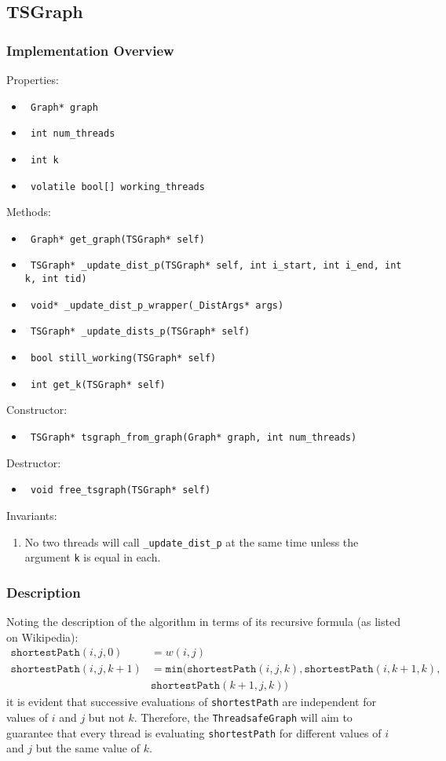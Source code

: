 \documentclass{article}
\newcommand{\field}[1]{\item \texttt{ #1 }}
\begin{document}
\subsection{TSGraph}
\subsubsection{Implementation Overview}
Properties:
\begin{itemize}
  \field{Graph* graph}
  \field{int num\_threads}
  \field{int k}
  \field{volatile bool[] working\_threads}\\
\end{itemize}
Methods:
\begin{itemize}
  \field{Graph* get\_graph(TSGraph* self)}
  \field{TSGraph* \_update\_dist\_p(TSGraph* self, int i\_start, int i\_end, int
    k, int tid)}
  \field{void* \_update\_dist\_p\_wrapper(\_DistArgs* args)}
  \field{TSGraph* \_update\_dists\_p(TSGraph* self)}
  \field{bool still\_working(TSGraph* self)}
  \field{int get\_k(TSGraph* self)}\\
\end{itemize}
Constructor:
\begin{itemize}
  \field{TSGraph* tsgraph\_from\_graph(Graph* graph, int num\_threads)}\\
\end{itemize}
Destructor:
\begin{itemize}
  \field{void free\_tsgraph(TSGraph* self)}\\
\end{itemize}
Invariants:
\begin{enumerate}
\item No two threads will call \texttt{\_update\_dist\_p} at the same
  time unless the argument \texttt{k} is equal in each.
\end{enumerate}

\subsubsection{Description}
Noting the description of the algorithm in terms of its recursive
formula (as listed on Wikipedia):
\begin{align*}
  \texttt{shortestPath}(i, j, 0) & =  w(i, j)\\
  \texttt{shortestPath}(i, j, k+1) & = 
  \texttt{min}(\texttt{shortestPath}(i, j, k), 
  \texttt{shortestPath}(i, k+1, k), \\ 
&\texttt{shortestPath}(k+1, j, k))
\end{align*}
\noindent
it is evident that successive evaluations of \texttt{shortestPath} are
independent for values of $i$ and $j$ but not $k$. Therefore, the
\texttt{ThreadsafeGraph} will aim to guarantee that every thread is
evaluating \texttt{shortestPath} for different values of $i$ and $j$
but the same value of $k$. 
\end{document}
